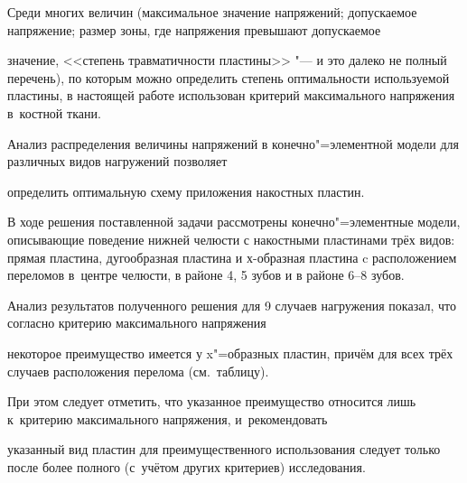 Среди многих величин (максимальное значение напряжений; допускаемое напряжение; размер зоны, где напряжения превышают допускаемое

значение,  <<степень травматичности пластины>> "--- и это далеко не полный перечень), по которым можно определить степень оптимальности используемой пластины, в настоящей работе использован критерий максимального напряжения в~костной ткани.



Анализ распределения величины напряжений в конечно"=элементной модели для различных видов нагружений позволяет

определить оптимальную схему приложения накостных пластин.



В ходе решения поставленной задачи рассмотрены конечно"=элементные модели, описывающие поведение нижней челюсти с накостными пластинами трёх видов: прямая пластина, дугообразная пластина и х-образная пластина c расположением переломов в~центре челюсти, в районе 4, 5 зубов и в районе 6--8 зубов.





Анализ результатов полученного решения для 9 случаев нагружения показал, что согласно критерию максимального напряжения

некоторое преимущество имеется у x"=образных  пластин, причём для всех трёх случаев расположения перелома (см.~таблицу).

При этом следует отметить, что указанное преимущество относится лишь  к~критерию максимального напряжения, и~рекомендовать

указанный вид пластин для преимущественного использования следует только после более полного (с~учётом других критериев) исследования.



